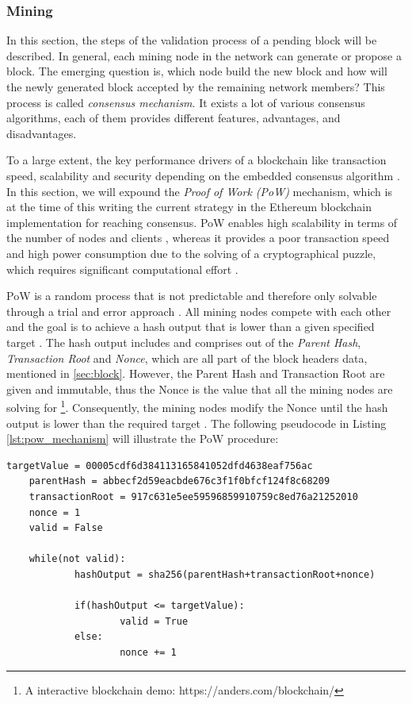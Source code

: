 \subsubsection{Mining}
\label{sec:mining}
In this section, the steps of the validation process of a pending block will be described. 
In general, each mining node in the network can generate or propose a block. 
The emerging question is, which node build the new block and how will the newly 
generated block accepted by the remaining network members? 
This process is called \textit{consensus mechanism}.
It exists a lot of various consensus algorithms, each of them provides different features,
advantages, and disadvantages. 

To a large extent, the key performance drivers of a blockchain
like transaction speed, scalability and security depending on the embedded consensus algorithm . 
In this section, we will expound the \textit{Proof of Work (PoW)} mechanism, 
which is at the time of this writing the current strategy in the Ethereum blockchain 
implementation for reaching consensus. 
PoW enables high scalability in terms of the number 
of nodes and clients , whereas it provides a poor transaction speed and high 
power consumption due to the solving of a cryptographical puzzle, which requires 
significant computational effort . 

PoW is a random process that is not predictable and therefore only solvable through a 
trial and error approach . 
All mining nodes compete with each other and the goal is to achieve a hash output that 
is lower than a given specified target .
The hash output includes and comprises out of the \textit{Parent Hash}, \textit{Transaction Root} and
\textit{Nonce}, which are all part of the block headers data, mentioned in \ref{sec:block}.
However, the Parent Hash and Transaction Root are given and immutable, thus the Nonce
is the value that all the mining nodes are solving for \footnote{A interactive blockchain demo: https://anders.com/blockchain/}.
Consequently, the mining nodes modify the Nonce until the hash output is lower than the required target .
The following pseudocode in Listing \ref{lst:pow_mechanism} will illustrate the PoW procedure:

\vspace{7mm}
\begin{lstlisting}[label={lst:pow_mechanism}, caption={Pseudocode for PoW mechanism}]
	targetValue = 00005cdf6d384113165841052dfd4638eaf756ac
	parentHash = abbecf2d59eacbde676c3f1f0bfcf124f8c68209
	transactionRoot = 917c631e5ee59596859910759c8ed76a21252010
	nonce = 1
	valid = False

	while(not valid):
			hashOutput = sha256(parentHash+transactionRoot+nonce)
		
			if(hashOutput <= targetValue):
					valid = True
			else:
					nonce += 1

\end{lstlisting}
\clearpage

